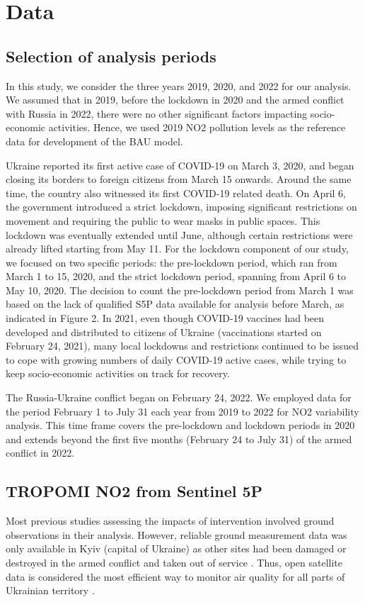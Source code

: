 \section{Data} \label{chap3_data}
\subsection{Selection of analysis periods}
In this study, we consider the three years 2019, 2020, and 2022 for our analysis. We assumed that in 2019, before the lockdown in 2020 and the armed conflict with Russia in 2022, there were no other significant factors impacting socio-economic activities. Hence, we used 2019 NO2 pollution levels as the reference data for development of the BAU model. \par
Ukraine reported its first active case of COVID-19 on March 3, 2020, and began closing its borders to foreign citizens from March 15 onwards. Around the same time, the country also witnessed its first COVID-19 related death. On April 6, the government introduced a strict lockdown, imposing significant restrictions on movement and requiring the public to wear masks in public spaces. This lockdown was eventually extended until June, although certain restrictions were already lifted starting from May 11. For the lockdown component of our study, we focused on two specific periods: the pre-lockdown period, which ran from March 1 to 15, 2020, and the strict lockdown period, spanning from April 6 to May 10, 2020. The decision to count the pre-lockdown period from March 1 was based on the lack of qualified S5P data available for analysis before March, as indicated in Figure 2. In 2021, even though COVID-19 vaccines had been developed and distributed to citizens of Ukraine (vaccinations started on February 24, 2021), many local lockdowns and restrictions continued to be issued to cope with growing numbers of daily COVID-19 active cases, while trying to keep socio-economic activities on track for recovery. \par
The Russia-Ukraine conflict began on February 24, 2022. We employed data for the period February 1 to July 31 each year from 2019 to 2022 for NO2 variability analysis. This time frame covers the pre-lockdown and lockdown periods in 2020 and extends beyond the first five months (February 24 to July 31) of the armed conflict in 2022.\par
\subsection{TROPOMI NO2 from Sentinel 5P}
Most previous studies assessing the impacts of intervention involved ground observations in their analysis. However, reliable ground measurement data was only available in Kyiv (capital of Ukraine) as other sites had been damaged or destroyed in the armed conflict and taken out of service \citep{savenets2021air}. Thus, open satellite data is considered the most efficient way to monitor air quality for all parts of Ukrainian territory \citep{shelestov2021air}. \par

